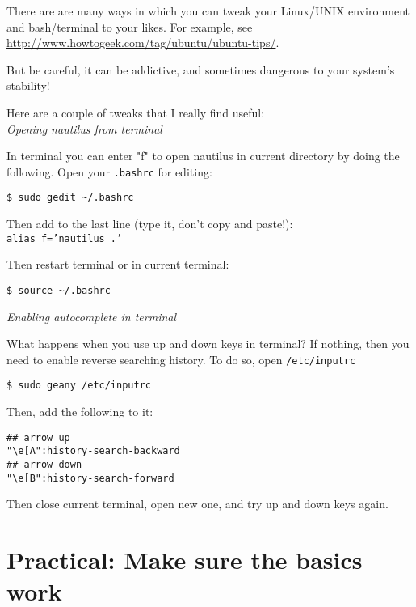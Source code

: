 \begin{tipbox}
There are are many ways in which you can tweak your Linux/UNIX 
environment and bash/terminal to your likes. For example, see 
\url{http://www.howtogeek.com/tag/ubuntu/ubuntu-tips/}.

But be careful, it can be addictive, and sometimes dangerous to your 
system's stability! 

Here are a couple of tweaks that I really find useful:\\

{\it Opening nautilus from terminal}

In terminal you can enter "f" to open nautilus in current directory 
by doing the following. Open your {\tt .bashrc} for editing:

\begin{lstlisting}
$ sudo gedit ~/.bashrc
\end{lstlisting}

Then add to the last line (type it, don't copy and paste!):\\
{\tt alias f='nautilus .'}

Then restart terminal or in current terminal:
\begin{lstlisting}
$ source ~/.bashrc
\end{lstlisting}

{\it Enabling autocomplete in terminal}

What happens when you use up and down keys in terminal? If nothing, 
then you need to enable reverse searching history. To do so, open 
{\tt /etc/inputrc}

\begin{lstlisting}
$ sudo geany /etc/inputrc
\end{lstlisting}

Then, add the following to it:

\begin{lstlisting}
## arrow up
"\e[A":history-search-backward
## arrow down
"\e[B":history-search-forward
\end{lstlisting}


Then close current terminal, open new one, and try up and down keys 
again.
\end{tipbox}
	      
\section[]{Practical: Make sure the basics work}
 
